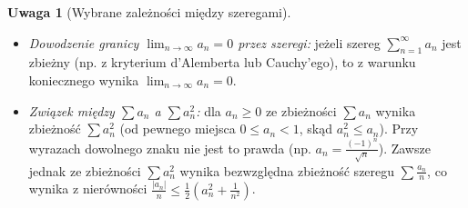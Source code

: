 \documentclass[11pt, a4paper]{article}
\theoremstyle{plain}
\theoremstyle{definition}
\newtheorem*{uwaga}{Uwaga}
\begin{document}
\begin{uwaga}[Wybrane zależności między szeregami]
\begin{itemize}
    \item \emph{Dowodzenie granicy $\lim_{n\to\infty} a_n = 0$ przez szeregi:} jeżeli szereg $\sum_{n=1}^\infty a_n$ jest zbieżny (np. z kryterium d'Alemberta lub Cauchy'ego), to z warunku koniecznego wynika $\lim_{n\to\infty} a_n = 0$.
    \item \emph{Związek między $\sum a_n$ a $\sum a_n^2$:} dla $a_n \geqslant 0$ ze zbieżności $\sum a_n$ wynika zbieżność $\sum a_n^2$ (od pewnego miejsca $0 \leqslant a_n < 1$, skąd $a_n^2 \leqslant a_n$). Przy wyrazach dowolnego znaku nie jest to prawda (np. $a_n = \frac{(-1)^n}{\sqrt{n}}$). Zawsze jednak ze zbieżności $\sum a_n^2$ wynika bezwzględna zbieżność szeregu $\sum \frac{a_n}{n}$, co wynika z nierówności $\frac{\lvert a_n \rvert}{n} \leqslant \frac{1}{2}\left(a_n^2 + \frac{1}{n^2}\right)$.
\end{itemize}
\end{uwaga}
\end{document}
